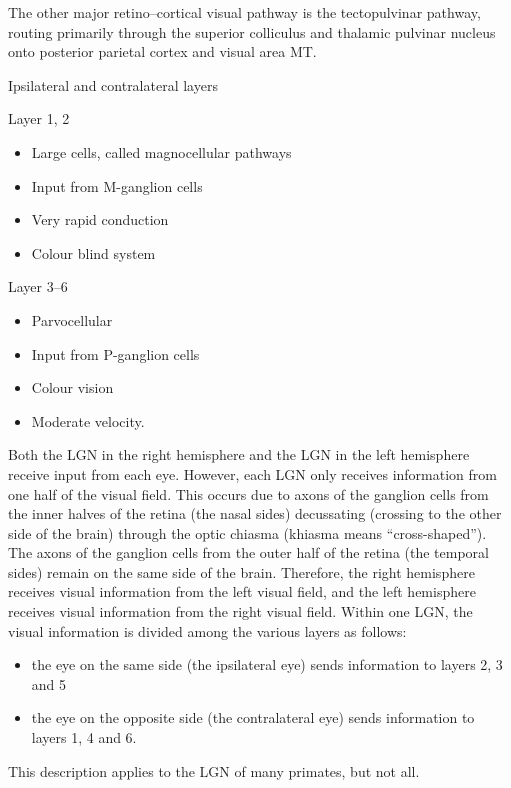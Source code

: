 The other major retino--cortical visual pathway is the tectopulvinar
pathway, routing primarily through the superior colliculus and thalamic
pulvinar nucleus onto posterior parietal cortex and visual area MT.

Ipsilateral and contralateral layers

Layer 1, 2

\begin{itemize}
\tightlist
\item
  Large cells, called magnocellular pathways
\item
  Input from M-ganglion cells
\item
  Very rapid conduction
\item
  Colour blind system
\end{itemize}

Layer 3--6

\begin{itemize}
\tightlist
\item
  Parvocellular
\item
  Input from P-ganglion cells
\item
  Colour vision
\item
  Moderate velocity.
\end{itemize}

Both the LGN in the right hemisphere and the LGN in the left hemisphere
receive input from each eye. However, each LGN only receives information
from one half of the visual field. This occurs due to axons of the
ganglion cells from the inner halves of the retina (the nasal sides)
decussating (crossing to the other side of the brain) through the optic
chiasma (khiasma means ``cross-shaped''). The axons of the ganglion
cells from the outer half of the retina (the temporal sides) remain on
the same side of the brain. Therefore, the right hemisphere receives
visual information from the left visual field, and the left hemisphere
receives visual information from the right visual field. Within one LGN,
the visual information is divided among the various layers as follows:

\begin{itemize}
\tightlist
\item
  the eye on the same side (the ipsilateral eye) sends information to
  layers 2, 3 and 5
\item
  the eye on the opposite side (the contralateral eye) sends information
  to layers 1, 4 and 6.
\end{itemize}

This description applies to the LGN of many primates, but not all.

